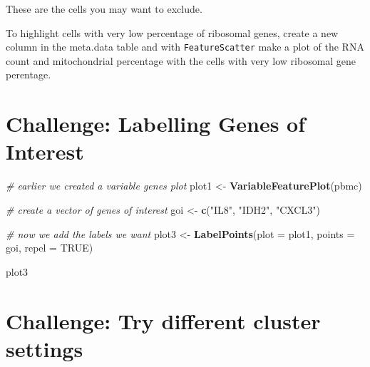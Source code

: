 \documentclass[
]{book}
\newenvironment{Shaded}{\begin{snugshade}}{\end{snugshade}}
\newcommand{\AttributeTok}[1]{\textcolor[rgb]{0.13,0.29,0.53}{#1}}
\newcommand{\CommentTok}[1]{\textcolor[rgb]{0.56,0.35,0.01}{\textit{#1}}}
\newcommand{\ConstantTok}[1]{\textcolor[rgb]{0.56,0.35,0.01}{#1}}
\newcommand{\DecValTok}[1]{\textcolor[rgb]{0.00,0.00,0.81}{#1}}
\newcommand{\FunctionTok}[1]{\textcolor[rgb]{0.13,0.29,0.53}{\textbf{#1}}}
\newcommand{\NormalTok}[1]{#1}
\newcommand{\OtherTok}[1]{\textcolor[rgb]{0.56,0.35,0.01}{#1}}
\newcommand{\SpecialCharTok}[1]{\textcolor[rgb]{0.81,0.36,0.00}{\textbf{#1}}}
\newcommand{\StringTok}[1]{\textcolor[rgb]{0.31,0.60,0.02}{#1}}
\begin{document}
These are the cells you may want to exclude.

To highlight cells with very low percentage of ribosomal genes, create a new column in the meta.data table and
with \texttt{FeatureScatter} make a plot of the RNA count and mitochondrial percentage with the cells with very low
ribosomal gene perentage.

\begin{Shaded}
\end{Shaded}

\hypertarget{challenge-labelling-genes-of-interest}{%
\section{Challenge: Labelling Genes of Interest}\label{challenge-labelling-genes-of-interest}}

\begin{Shaded}
\begin{Highlighting}[]
\CommentTok{\# earlier we created a variable genes plot}
\NormalTok{plot1 }\OtherTok{\textless{}{-}} \FunctionTok{VariableFeaturePlot}\NormalTok{(pbmc)}

\CommentTok{\# create a vector of genes of interest}
\NormalTok{goi }\OtherTok{\textless{}{-}} \FunctionTok{c}\NormalTok{(}\StringTok{"IL8"}\NormalTok{, }\StringTok{"IDH2"}\NormalTok{, }\StringTok{"CXCL3"}\NormalTok{)}

\CommentTok{\# now we add the labels we want}
\NormalTok{plot3 }\OtherTok{\textless{}{-}} \FunctionTok{LabelPoints}\NormalTok{(}\AttributeTok{plot =}\NormalTok{ plot1, }\AttributeTok{points =}\NormalTok{ goi, }\AttributeTok{repel =} \ConstantTok{TRUE}\NormalTok{)}

\NormalTok{plot3}
\end{Highlighting}
\end{Shaded}

\hypertarget{challenge-try-different-cluster-settings-1}{%
\section{Challenge: Try different cluster settings}\label{challenge-try-different-cluster-settings-1}}
\end{document}
